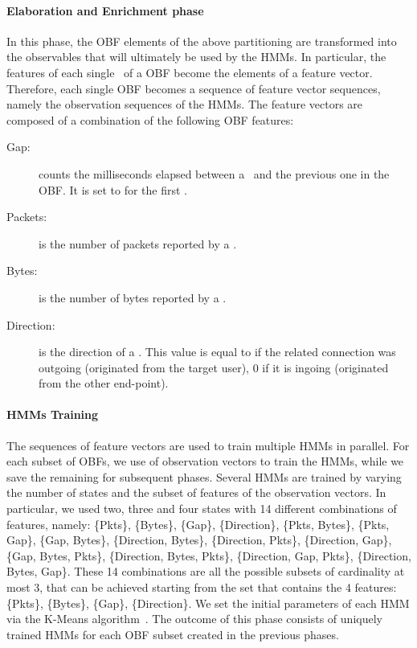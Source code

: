 \documentclass[10pt,conference,compsocconf,letterpaper]{IEEEtran}
\begin{document}
\paragraph{Elaboration and Enrichment phase}
In this phase, the OBF elements of the above partitioning are
transformed into the observables that will ultimately be used by the HMMs. In
particular, the features of each single \nfr\ of a OBF become the
elements of a feature vector. Therefore, each single OBF becomes a
sequence of feature vector sequences, namely the observation sequences
of the HMMs. The feature vectors are composed of a combination
of the following OBF features:
\begin{description}
\item[Gap:] counts the milliseconds elapsed between a \nfr\ and the
  previous one in the OBF. It is set to  for the first \nfr.
\item[Packets:] is the number of packets reported by a \nfr.
\item[Bytes:] is the number of bytes reported by a \nfr.
\item[Direction:] is the direction of a \nfr. This value is equal to
   if the related connection was outgoing (originated from the
  target user), 0 if it is ingoing (originated from the other
  end-point).
\end{description}
\paragraph{HMMs Training}
The sequences of feature vectors are  used to train multiple
HMMs in parallel. For each subset of OBFs, we use  of
observation vectors to train the HMMs, while we save the remaining  for
subsequent phases. Several HMMs are trained by varying the number of 
states and the subset of features of the observation vectors. 
In particular, we used two, three and four states with 14
different combinations of features, namely: \{Pkts\}, \{Bytes\}, \{Gap\},
\{Direction\}, \{Pkts, Bytes\}, \{Pkts, Gap\}, \{Gap, Bytes\},
\{Direction, Bytes\}, \{Direction, Pkts\}, \{Direction, Gap\}, \{Gap,
Bytes, Pkts\}, \{Direction, Bytes, Pkts\}, \{Direction, Gap, Pkts\},
\{Direction, Bytes, Gap\}. These 14 combinations are all the possible 
subsets of cardinality at most 3, that can be achieved starting from 
the set that contains the 4 features:
\{Pkts\}, \{Bytes\}, \{Gap\}, \{Direction\}. 
We set the initial parameters of each HMM
via the K-Means algorithm~\cite{Kanungo2002}. The outcome of this phase consists of  uniquely trained HMMs
for each OBF subset created in the previous phases.
\end{document}

